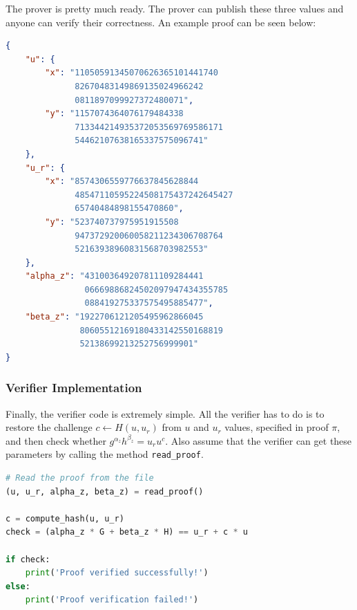 \documentclass[../lecture-notes-148x210.tex]{subfiles}
\begin{document}
The prover is pretty much ready. The prover can publish these three values and anyone 
can verify their correctness. An example proof can be seen below:
\begin{center}
    \begin{tcolorbox}[enhanced,
        width=0.925\textwidth,
        title=\textbf{proof.json},
        coltitle=gray!25!black,
        attach boxed title to top center={yshift=-2mm,yshifttext=-1mm},
        boxed title style={size=small,colframe=gray!75!black,
        colback=purple!30!white,boxrule=1pt},
        top=-0.35cm,
        bottom=-0.35cm]
        \begin{lstlisting}[language=JSON,numbers=none,basicstyle=\ttfamily\scriptsize]
{
    "u": {
        "x": "11050591345070626365101441740
              82670483149869135024966242
              0811897099927372480071",
        "y": "1157074364076179484338
              713344214935372053569769586171
              54462107638165337575096741"
    },
    "u_r": {
        "x": "8574306559776637845628844
              48547110595224508175437242645427
              65740484898155470860",
        "y": "523740737975951915508
              947372920060058211234306708764
              52163938960831568703982553"
    },
    "alpha_z": "431003649207811109284441
                06669886824502097947434355785
                088419275337575495885477",
    "beta_z": "1922706121205495962866045
               80605512169180433142550168819
               52138699213252756999901"
}
        \end{lstlisting}
    \end{tcolorbox}
\end{center}

\subsubsection{Verifier Implementation}

Finally, the verifier code is extremely simple. All the verifier has to do is to
restore the challenge $c \gets H(u,u_r)$ from $u$ and $u_r$ values, specified in
proof $\pi$, and then check whether $g^{\alpha_z}h^{\beta_z}=u_ru^c$. Also assume 
that the verifier can get these parameters by calling the method \texttt{read\_proof}.
\begin{lstlisting}[language=Python]
# Read the proof from the file
(u, u_r, alpha_z, beta_z) = read_proof()

c = compute_hash(u, u_r)
check = (alpha_z * G + beta_z * H) == u_r + c * u

if check:
    print('Proof verified successfully!')
else:
    print('Proof verification failed!')
\end{lstlisting}
\end{document}
